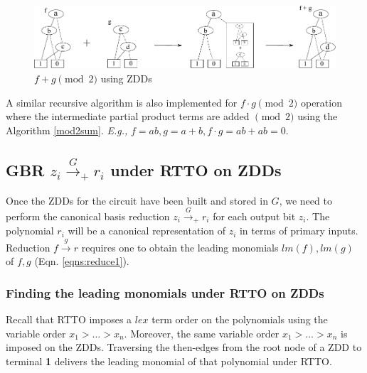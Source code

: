 \begin{figure}[hbt]
\centering
\includegraphics[scale=1]{figures/mod2sumfig_new_1.pdf}
\caption{{$f+g\pmod 2$ using ZDDs}}
\label{mod2sumfig}
\end{figure}

A similar recursive algorithm is also implemented for $f\cdot g \pmod
2$ operation where the intermediate partial product terms are added
$\pmod{2}$ using the Algorithm \ref{mod2sum}. {\it E.g.,} $f = ab, g =
a+b, f\cdot g = ab + ab = 0$. 


\subsection{GBR $z_i\xrightarrow{G}_+r_i$ under RTTO on ZDDs}



Once the ZDDs for the circuit have been built and stored in $G$, we
need to perform the canonical \Grobner basis reduction $z_i
\xrightarrow{G}_+r_i$ for each output bit $z_i$. The polynomial $r_i$
will be a canonical representation of $z_i$ in terms of primary
inputs. Reduction $f\xrightarrow{g} r$ requires one to obtain the leading
monomials $lm(f),lm(g)$ of $f, g$ (Eqn. \ref{eqns:reduce1}).


\subsubsection{Finding the leading monomials under RTTO on ZDDs}
Recall that RTTO imposes a $lex$ term order on the polynomials using
the variable order $x_1>\dots>x_n$. Moreover, the same variable order
$x_1>\dots>x_n$ is imposed on the ZDDs. Traversing the
then-edges from the root node of a ZDD to terminal {\bf 1}
delivers the leading monomial of that polynomial under RTTO.



